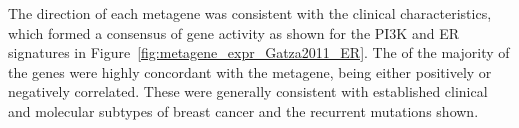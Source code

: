 The direction of each \gls{metagene} was consistent with the clinical characteristics, which formed a consensus of gene activity as shown for the PI3K and \gls{ER} signatures \citep{Gatza2011} in Figure~\ref{fig:metagene_expr_Gatza2011_ER}. %
The  of the majority of the genes were highly concordant with the \gls{metagene}, being either positively or negatively correlated. These were generally consistent with established clinical and molecular subtypes of breast cancer and the \glspl{recurrent mutation} shown. %

